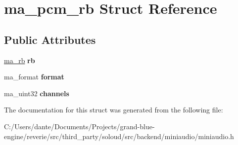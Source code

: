 \hypertarget{structma__pcm__rb}{}\section{ma\+\_\+pcm\+\_\+rb Struct Reference}
\label{structma__pcm__rb}
\subsection*{Public Attributes}
\begin{DoxyCompactItemize}
\item 
\mbox{\label{structma__pcm__rb_a94491bd6e52b180bf620cbd4000c96c2}} 
\mbox{\hyperlink{structma__rb}{ma\+\_\+rb}} {\bfseries rb}
\item 
\mbox{\label{structma__pcm__rb_a9b736599b42e1c173caa0875840da2e0}} 
ma\+\_\+format {\bfseries format}
\item 
\mbox{\label{structma__pcm__rb_a0235df2d2e4058913174a3f8d61b720d}} 
ma\+\_\+uint32 {\bfseries channels}
\end{DoxyCompactItemize}


The documentation for this struct was generated from the following file\+:\begin{DoxyCompactItemize}
\item 
C\+:/\+Users/dante/\+Documents/\+Projects/grand-\/blue-\/engine/reverie/src/third\+\_\+party/soloud/src/backend/miniaudio/miniaudio.\+h\end{DoxyCompactItemize}
